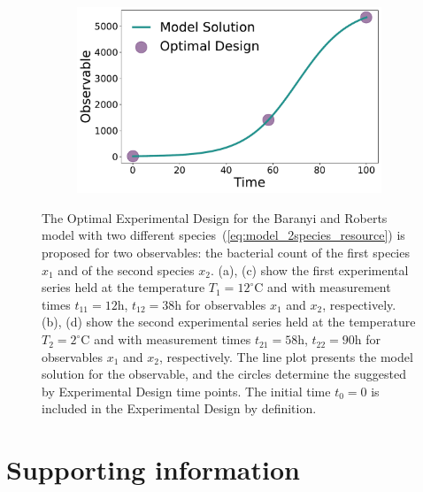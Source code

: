 \documentclass[graybox]{svmult}
\begin{document}
\begin{figure}[H]
\begin{subfigure}{.5\textwidth}
    \end{subfigure}
    \begin{subfigure}{.5\textwidth}
        \centering
        \includegraphics[scale=0.25]{Figures/Fig9d.pdf}
    \end{subfigure} 
    \caption{The Optimal Experimental Design for the Baranyi and Roberts model with two different species~(\ref{eq:model_2species_resource}) is proposed for two observables: the bacterial count of the first species $x_1$ and of the second species $x_2$.
    (a), (c) show the first experimental series held at the temperature $T_1=12^\circ$C and with measurement times $t_{11}=12$h, $t_{12}=38$h for observables $x_1$ and $x_2$, respectively.
    (b), (d) show the second experimental series held at the temperature $T_2=2^\circ$C and with measurement times $t_{21}=58$h, $t_{22}=90$h for observables $x_1$ and $x_2$, respectively.
    The line plot presents the model solution for the observable, and the circles determine the suggested by Experimental Design time points.
    The initial time $t_0=0$ is included in the Experimental Design by definition.}
    \label{Fig9}
\end{figure}

\section*{Supporting information}
%
%
%
\nolinenumbers

\end{document}
